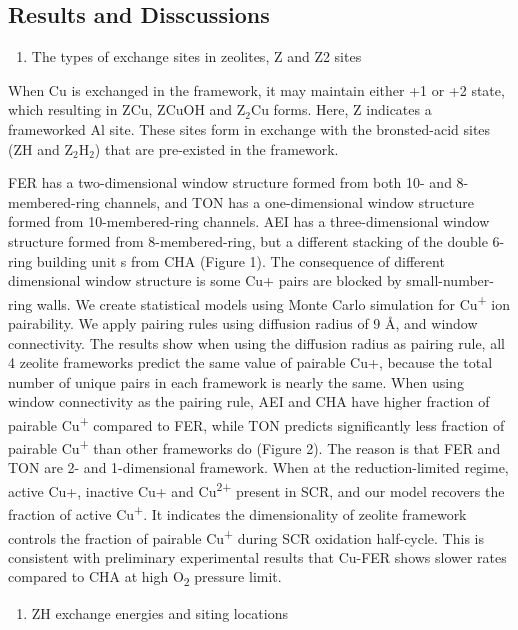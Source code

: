 \documentclass[12pt]{article}
\begin{document}
\subsection*{Results and Disscussions}
\begin{enumerate}
\item The types of exchange sites in zeolites, Z and Z2 sites
\end{enumerate}

When Cu is exchanged in the framework, it may maintain either +1 or +2 state, which resulting in ZCu, ZCuOH and Z$_{2}$Cu forms. Here, Z indicates a frameworked Al site. These sites form in exchange with the bronsted-acid sites (ZH and Z$_{2}$H$_{2}$) that are pre-existed in the framework.

FER has a two-dimensional window structure formed from both 10- and 8-membered-ring channels, and TON has a one-dimensional window structure formed from 10-membered-ring channels. AEI has a three-dimensional window structure formed from 8-membered-ring, but a different stacking of the double 6-ring building unit s from CHA (Figure 1). The consequence of different dimensional window structure is some Cu+ pairs are blocked by small-number-ring walls. We create statistical models using Monte Carlo simulation for Cu\textsuperscript{+} ion pairability. We apply pairing rules using diffusion radius of 9 Å, and window connectivity. The results show when using the diffusion radius as pairing rule, all 4 zeolite frameworks predict the same value of pairable Cu+, because the total number of unique pairs in each framework is nearly the same. When using window connectivity as the pairing rule, AEI and CHA have higher fraction of pairable Cu\textsuperscript{+} compared to FER, while TON predicts significantly less fraction of pairable Cu\textsuperscript{+} than other frameworks do (Figure 2). The reason is that FER and TON are 2- and 1-dimensional framework. When at the reduction-limited regime, active Cu+, inactive Cu+ and Cu\textsuperscript{2+} present in SCR, and our model recovers the fraction of active Cu\textsuperscript{+}. It indicates the dimensionality of zeolite framework controls the fraction of pairable Cu\textsuperscript{+} during SCR oxidation half-cycle. This is consistent with preliminary experimental results that Cu-FER shows slower rates compared to CHA at high O\textsubscript{2} pressure limit.


\begin{enumerate}[resume]
\item ZH exchange energies and siting locations
\end{enumerate}
\end{document}
